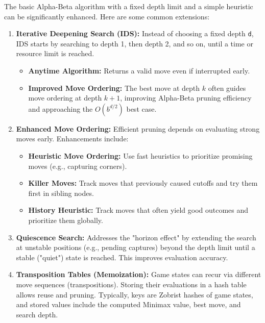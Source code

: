\documentclass[11pt]{article}
\begin{document}
The basic Alpha-Beta algorithm with a fixed depth limit and a simple heuristic can be significantly enhanced. Here are some common extensions:

\begin{enumerate}
    \item \textbf{Iterative Deepening Search (IDS):} Instead of choosing a fixed depth \texttt{d}, IDS starts by searching to depth 1, then depth 2, and so on, until a time or resource limit is reached.
    \begin{itemize}
        \item \textbf{Anytime Algorithm:} Returns a valid move even if interrupted early.
        \item \textbf{Improved Move Ordering:} The best move at depth $k$ often guides move ordering at depth $k+1$, improving Alpha-Beta pruning efficiency and approaching the $O(b^{d/2})$ best case.
    \end{itemize}

    \item \textbf{Enhanced Move Ordering:} Efficient pruning depends on evaluating strong moves early. Enhancements include:
    \begin{itemize}
        \item \textbf{Heuristic Move Ordering:} Use fast heuristics to prioritize promising moves (e.g., capturing corners).
        \item \textbf{Killer Moves:} Track moves that previously caused cutoffs and try them first in sibling nodes.
        \item \textbf{History Heuristic:} Track moves that often yield good outcomes and prioritize them globally.
    \end{itemize}

    \item \textbf{Quiescence Search:} Addresses the "horizon effect" by extending the search at unstable positions (e.g., pending captures) beyond the depth limit until a stable ("quiet") state is reached. This improves evaluation accuracy.

    \item \textbf{Transposition Tables (Memoization):} Game states can recur via different move sequences (transpositions). Storing their evaluations in a hash table allows reuse and pruning. Typically, keys are Zobrist hashes of game states, and stored values include the computed Minimax value, best move, and search depth.
\end{enumerate}
\end{document}
